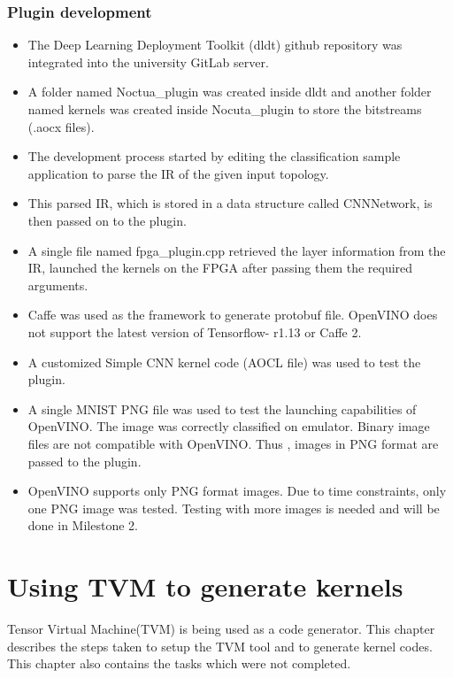 \documentclass[titlepage]{report}
\begin{document}
\subsection{Plugin development}
\begin{itemize}
\item The Deep Learning Deployment Toolkit (dldt) github repository was integrated into the university GitLab server. 
\item A folder named Noctua\_plugin was created inside dldt and another folder named kernels was created inside Nocuta\_plugin to store the bitstreams (.aocx files).
\item The development process started by editing the classification sample application to parse the IR of the given input topology. 
\item This parsed IR, which is stored in a data structure called CNNNetwork, is then passed on to the plugin. 
\item A single file named fpga\_plugin.cpp retrieved the layer information from the IR, launched the kernels on the FPGA after passing them the required arguments.
\item Caffe was used as the framework to generate protobuf file. OpenVINO does not support the latest version of Tensorflow- r1.13 or Caffe 2.
\item A customized Simple CNN kernel code (AOCL file) was used to test the plugin.
\item A single MNIST PNG file was used to test the launching capabilities of OpenVINO. The image was correctly classified on emulator. Binary image files are not compatible with OpenVINO. Thus , images in PNG format are passed to the plugin.
\item OpenVINO supports only PNG format images. Due to time constraints, only one PNG image was tested. Testing with more images is needed and will be done in Milestone 2.
 
\end{itemize} 





\chapter{Using TVM to generate kernels}
Tensor Virtual Machine(TVM) is being used as a code generator. This chapter describes the steps taken to setup the TVM tool and to generate kernel codes. This chapter also contains the tasks which were not completed.
\end{document}
